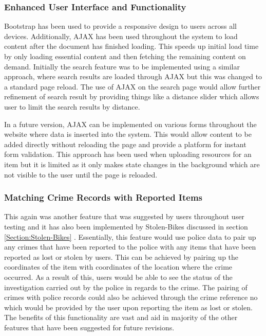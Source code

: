\subsubsection{Enhanced User Interface and Functionality}
Bootstrap has been used to provide a responsive design to users across all devices. Additionally, AJAX has been used throughout the system to load content after the document has finished loading. This speeds up initial load time by only loading essential content and then fetching the remaining content on demand. Initially the search feature was to be implemented using a similar approach, where search results are loaded through AJAX but this was changed to a standard page reload. The use of AJAX on the search page would allow further refinement of search result by providing things like a distance slider which allows user to limit the search results by distance. 

In a future version, AJAX can be implemented on various forms throughout the website where data is inserted into the system. This would allow content to be added directly without reloading the page and provide a platform for instant form validation. This approach has been used when uploading resources for an item but it is limited as it only makes state changes in the background which are not visible to the user until the page is reloaded.

\subsubsection{Matching Crime Records with Reported Items}
This again was another feature that was suggested by users throughout user testing and it has also been implemented by Stolen-Bikes discussed in section \ref{Section:Stolen-Bikes} \cite{StolenBikes:Home}. Essentially, this feature would use police data to pair up any crimes that have been reported to the police with any items that have been reported as lost or stolen by users. This can be achieved by pairing up the coordinates of the item with coordinates of the location where the crime occurred. As a result of this, users would be able to see the status of the investigation carried out by the police in regards to the crime. The pairing of crimes with police records could also be achieved through the crime reference no which would be provided by the user upon reporting the item as lost or stolen. The benefits of this functionality are vast and aid in majority of the other features that have been suggested for future revisions.

\newpage